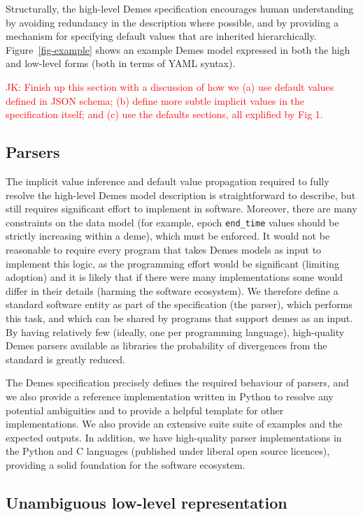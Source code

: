 \documentclass[11pt]{article}
\newcommand{\jkcomment}[1]{{\textcolor{red}{JK: #1}}}
\begin{document}
Structurally, the high-level Demes specification encourages human understanding
by avoiding redundancy in the description where possible, and
by providing a mechanism for specifying default values that
are inherited hierarchically. Figure~\ref{fig-example} shows an example
Demes model expressed in both the high and low-level forms (both in
terms of YAML syntax).

\jkcomment{Finish up this section with a discussion of how we (a)
use default values defined in JSON schema; (b) define more
subtle implicit values in the specification itself; and (c) use the
defaults sections, all explified by Fig 1.}

\subsection*{Parsers}
The implicit value inference and default value propagation required to
fully resolve the high-level Demes model description is straightforward
to describe, but still requires significant effort to implement in
software. Moreover, there are many constraints on the data model
(for example, epoch \texttt{end\_time} values should be strictly increasing
within a deme), which must be enforced.
It would not be reasonable to require every program that
takes Demes models as input to implement this logic, as the programming
effort would be significant (limiting adoption)
and it is likely that if there were many implementations some would differ
in their details (harming the software ecosystem). We therefore define
a standard software entity as part of the specification (the parser),
which performs this task, and which can be shared by programs that
support demes as an input. By having relatively few (ideally, one
per programming language), high-quality Demes parsers available as
libraries the probability of divergences from the standard is
greatly reduced.

The Demes specification precisely defines the required behaviour of
parsers, and we also provide a reference implementation written
in Python to resolve any potential ambiguities and to provide a
helpful template for other implementations. We also provide an
extensive suite suite of examples and the expected outputs. In addition,
we have high-quality parser implementations in the Python and C
languages (published under liberal open source licences),
providing a solid foundation for the software ecosystem.


\subsection*{Unambiguous low-level representation}
\end{document}
